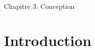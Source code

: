 \documentclass[12pt, letterpaper]{article}
\begin{document}
\begin{center}
    \huge{Chapitre 3: Conception}
\end{center}
\section{Introduction}


\section{}
\end{document}
